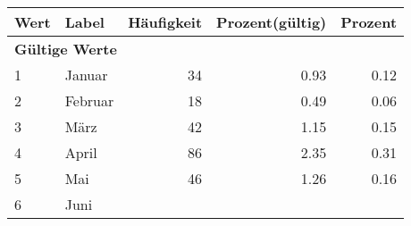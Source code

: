      \begin{longtable}{lXrrr}
     \toprule
     \textbf{Wert} & \textbf{Label} & \textbf{Häufigkeit} & \textbf{Prozent(gültig)} & \textbf{Prozent} \\
     \endhead
     \midrule
     \multicolumn{5}{l}{\textbf{Gültige Werte}}\\

     1 &
     \multicolumn{1}{X}{ Januar   } &


       \num{34} &
       \num[round-mode=places,round-precision=2]{0.93} &
         \num[round-mode=places,round-precision=2]{0.12} \\

     2 &
     \multicolumn{1}{X}{ Februar   } &


       \num{18} &
       \num[round-mode=places,round-precision=2]{0.49} &
         \num[round-mode=places,round-precision=2]{0.06} \\

     3 &
     \multicolumn{1}{X}{ März   } &


       \num{42} &
       \num[round-mode=places,round-precision=2]{1.15} &
         \num[round-mode=places,round-precision=2]{0.15} \\

     4 &
     \multicolumn{1}{X}{ April   } &


       \num{86} &
       \num[round-mode=places,round-precision=2]{2.35} &
         \num[round-mode=places,round-precision=2]{0.31} \\

     5 &
     \multicolumn{1}{X}{ Mai   } &


       \num{46} &
       \num[round-mode=places,round-precision=2]{1.26} &
         \num[round-mode=places,round-precision=2]{0.16} \\

     6 &
     \multicolumn{1}{X}{ Juni   } &



\end{longtable}
